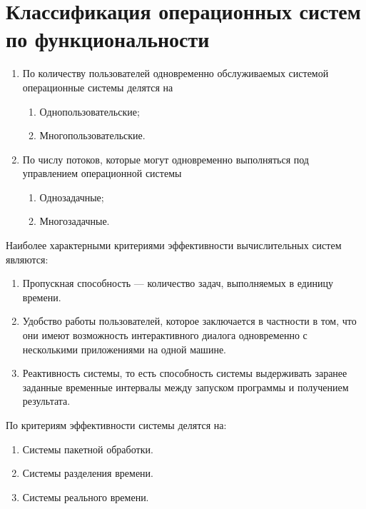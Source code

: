 \section{Классификация операционных систем по функциональности}
\begin{enumerate}
	\item По количеству пользователей одновременно обслуживаемых системой
		операционные системы делятся на
		\begin{enumerate}
			\item Однопользовательские;
			\item Многопользовательские.
		\end{enumerate}
	\item По числу потоков, которые могут одновременно выполняться под управлением
		операционной системы
		\begin{enumerate}
			\item Однозадачные;
			\item Многозадачные.
		\end{enumerate}
\end{enumerate}\par
Наиболее характерными критериями эффективности вычислительных систем являются:
\begin{enumerate}
	\item Пропускная способность --- количество задач, выполняемых в единицу
		времени.
	\item Удобство работы пользователей, которое заключается в частности в том,
		что они имеют возможность интерактивного диалога одновременно с несколькими
		приложениями на одной машине.
	\item Реактивность системы, то есть способность системы выдерживать заранее
		заданные временные интервалы между запуском программы и получением
		результата.
\end{enumerate}
По критериям эффективности системы делятся на:
\begin{enumerate}
	\item Системы пакетной обработки.
	\item Системы разделения времени.
	\item Системы реального времени.
\end{enumerate}
